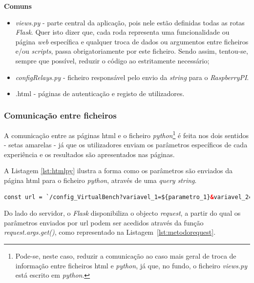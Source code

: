 \textbf{Comuns}
\begin{itemize}
	\item \textit{views.py} - parte central da aplicação, pois nele estão definidas todas as rotas \textit{Flask}. Quer isto dizer que, cada roda representa uma funcionalidade ou página \textit{web} específica e qualquer troca de dados ou argumentos entre ficheiros e/ou \textit{scripts}, passa obrigatoriamente por este ficheiro. Sendo assim, tentou-se, sempre que possível, reduzir o código ao estritamente necessário;
	\item \textit{configRelays.py} - ficheiro responsável pelo envio da \textit{string} para o \textit{RaspberryPI}.
	\item {}.html - páginas de autenticação e registo de utilizadores.
\end{itemize}

\subsubsection{Comunicação entre ficheiros}
\label{sec:comunicacaoentrefich}
A comunicação entre as páginas \acrshort{html} e o ficheiro \textit{python}\footnote{Pode-se, neste caso, reduzir a comunicação ao caso mais geral de troca de informação entre ficheiros \acrshort{html} e \textit{python}, já que, no fundo, o ficheiro \textit{views.py} está escrito em \textit{python}.} é feita nos dois sentidos - setas amarelas - já que os utilizadores enviam os parâmetros específicos de cada experiência e os resultados são apresentados nas páginas. 

A Listagem \ref{lst:htmlpy} ilustra a forma como os parâmetros são enviados da página \acrshort{html} para o ficheiro \textit{python}, através de uma \textit{query string}.

\begin{minipage}{0.9\linewidth}
	\begin{lstlisting}[language=html, escapechar=|, caption=Envio de parâmetros \acrshort{html} $\rightarrow$ \textit{views.py}, label=lst:htmlpy]
	const url = `/config_VirtualBench?variavel_1=${parametro_1}&variavel_2=${parametro_2}&variavel_3=${parametro_3}`; |\label{line:parametros}|
	\end{lstlisting}
\end{minipage}

Do lado do servidor, o \textit{Flask} disponibiliza o objecto \textit{request}, a partir do qual os parâmetros enviados por \acrshort{url} podem ser acedidos através da função \textit{request.args.get()}, como representado na Listagem~\ref{lst:metodorequest}.

